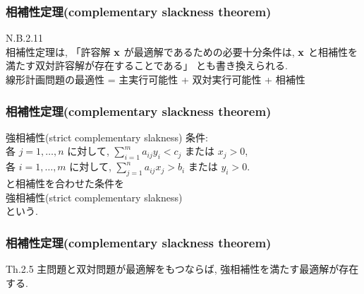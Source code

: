 \documentclass[unicode, 12pt, aspectratio = 169]{beamer}
\begin{document}
\begin{frame}[fragile]
	\frametitle{相補性定理(complementary slackness theorem)}
	N.B.2.11 \\
	相補性定理は, 「許容解 $\bf x$ が最適解であるための必要十分条件は, $\bf x$ と相補性を満たす双対許容解が存在することである」
	とも書き換えられる. \\
	線形計画問題の最適性 = 主実行可能性 + 双対実行可能性 + 相補性
\end{frame}

\begin{frame}[fragile]
	\frametitle{相補性定理(complementary slackness theorem)}
	\begin{itembox}[l]{強相補性(strict complementary slakness)}
		条件: \\
		各 $j = 1, \dots, n$ に対して, $\displaystyle \sum_{i=1}^m a_{ij} y_i < c_j$ または $x_j > 0$, \vspace{1em} \\
		各 $i = 1, \dots, m$ に対して, $\displaystyle \sum_{j=1}^n a_{ij} x_j > b_i$ または $y_i > 0$. \vspace{1em} \\
		と相補性を合わせた条件を \\
		強相補性(strict complementary slakness) \\
		という.
	\end{itembox}
\end{frame}

\begin{frame}[fragile]
	\frametitle{相補性定理(complementary slackness theorem)}
		\begin{itembox}[l]{Th.2.5}
			主問題と双対問題が最適解をもつならば, 強相補性を満たす最適解が存在する.
		\end{itembox}
\end{frame}

\end{document}
